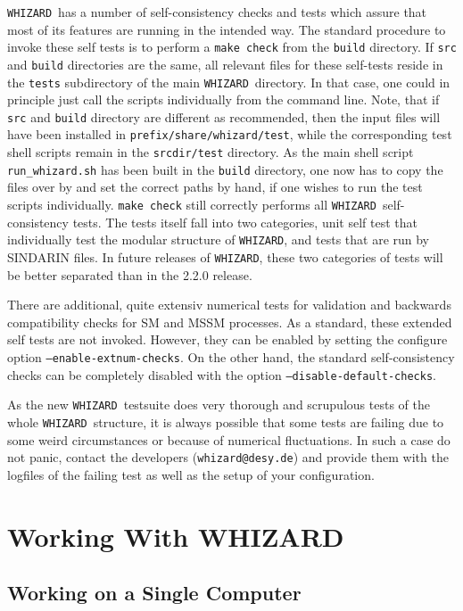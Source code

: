 \documentclass[12pt]{book}
\newcommand{\ttt}[1]{\texttt{#1}}
\newcommand{\whizard}{\texttt{WHIZARD}}
\begin{document}
\whizard\ has a number of self-consistency checks and tests which assure
that most of its features are running in the intended way. The
standard procedure to invoke these self tests is to perform a
\texttt{make check} from the \texttt{build} directory. If \texttt{src}
and \texttt{build} directories are the same, all relevant files for
these self-tests reside in the \texttt{tests} subdirectory of the main
\whizard\ directory. In that case, one could in principle just call the
scripts individually from the command line. Note, that if \texttt{src}
and \texttt{build} directory are different as recommended, then the
input files will have been installed in
\ttt{prefix/share/whizard/test}, while the corresponding test shell
scripts remain in the \ttt{srcdir/test} directory. As the main shell
script \ttt{run\_whizard.sh} has been built in the \texttt{build}
directory, one now has to copy the files over by and set the correct
paths by hand, if one wishes to run the test scripts individually. 
\texttt{make check} still correctly performs all \whizard\
self-consistency tests. The tests itself fall into two categories,
unit self test that individually test the modular structure of
\whizard, and tests that are run by SINDARIN files. In future releases 
of \whizard, these two categories of tests will be better separated
than in the 2.2.0 release.

There are additional, quite extensiv numerical tests for validation
and backwards compatibility checks for SM and MSSM processes. As a
standard, these extended self tests are not invoked. However, they can
be enabled by setting the configure option
\ttt{--enable-extnum-checks}. On the other hand, the standard
self-consistency checks can be completely disabled with the option
\ttt{--disable-default-checks}. 

As the new \whizard\ testsuite does very thorough and scrupulous tests
of the whole \whizard\ structure, it is always possible that some
tests are failing due to some weird circumstances or because of
numerical fluctuations. In such a case do not panic, contact the
developers (\ttt{whizard@desy.de}) and provide them with the logfiles
of the failing test as well as the setup of your configuration. 


\section{Working With WHIZARD}

\subsection{Working on a Single Computer}
\label{sec:workspace}
\end{document}
